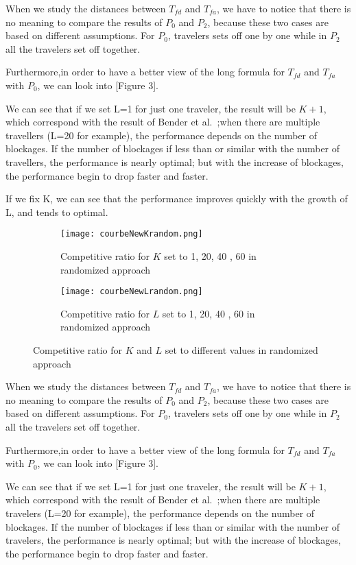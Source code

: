\documentclass[letter-size, 11pt]{article}
\begin{document}
When we study the distances between $T_{fd}$ and $T_{fa}$, we have to notice that there is no meaning to compare the results of $P_0$ and $P_2$, because these two cases are based on different assumptions. For $P_0$, travelers sets off one by one while in $P_2$ all the travelers set off together.

Furthermore,in order to have a better view of the long formula for $T_{fd}$ and $T_{fa}$ with $P_0$, we can look into [Figure 3].

We can see that if we set L=1 for just one traveler, the result will be $K+1$, which correspond with the result of Bender et al.~\cite{BeWe15};when there are multiple travellers (L=20 for example), the performance depends on the number of blockages. If the number of blockages if less than or similar with the number of travellers, the performance is nearly optimal; but with the increase of blockages, the performance begin to drop faster and faster.

If we fix K, we can see that the performance improves quickly with the growth of L, and tends to optimal.


\begin{figure*}[h]
    \centering
    \begin{subfigure}[H]{0.475\textwidth}
            \texttt{[image: courbeNewKrandom.png]}
            \caption{Competitive ratio for $K$ set to 1, 20, 40 , 60 in randomized approach}
            \label{a}
    \end{subfigure}
    \begin{subfigure}[H]{0.475\textwidth}
            \texttt{[image: courbeNewLrandom.png]}
            \caption{Competitive ratio for $L$ set to 1, 20, 40 , 60 in randomized approach}
            \label{b}
    \end{subfigure}
    \caption{Competitive ratio for $K$ and $L$ set to different values in randomized approach}\label{fig:ABCD}
\end{figure*}


When we study the distances between $T_{fd}$ and $T_{fa}$, we have to notice that there is no meaning to compare the results of $P_0$ and $P_2$, because these two cases are based on different assumptions. For $P_0$, travelers sets off one by one while in $P_2$ all the travelers set off together.

Furthermore,in order to have a better view of the long formula for $T_{fd}$ and $T_{fa}$ with $P_0$, we can look into [Figure 3].

We can see that if we set L=1 for just one traveler, the result will be $K+1$, which correspond with the result of Bender et al.~\cite{BeWe15};when there are multiple travelers (L=20 for example), the performance depends on the number of blockages. If the number of blockages if less than or similar with the number of travelers, the performance is nearly optimal; but with the increase of blockages, the performance begin to drop faster and faster.
\end{document}
